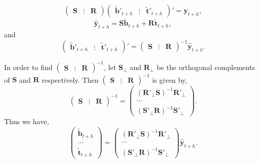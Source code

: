 \documentclass[a4paper, 11pt]{article}
\begin{document}
	\[
	\begin{pmatrix}
	\bm{S} & \vdots& \bm{R}
	\end{pmatrix}
	\begin{pmatrix}
	\tilde{\bm{b}}'_{t+h} & \vdots& \tilde{\bm{t}}'_{t+h}
	\end{pmatrix}'
	= \hat{\bm{y}}_{t+h},
	\]
	\[
	\hat{\bm{y}}_{t+h} = \bm{S}\tilde{\bm{b}}_{t+h} +  \bm{R}\tilde{\bm{t}}_{t+h},
	\]
	and
	\begin{equation}\label{4.3}
	\begin{pmatrix}
	\tilde{\bm{b}}'_{t+h} & \vdots& \tilde{\bm{t}}'_{t+h}
	\end{pmatrix}' =
	\begin{pmatrix}
	\bm{S} & \vdots& \bm{R}
	\end{pmatrix}^{-1}
	\hat{\bm{y}}_{t+h}.
	\end{equation}
	
	In order to find $\begin{pmatrix}\bm{S} & \vdots& \bm{R}\end{pmatrix}^{-1}$, let $\bm{S}_{\bot}$ and $\bm{R}_{\bot}$ be the orthogonal complements of $\bm{S}$ and $\bm{R}$
	respectively. Then $\begin{pmatrix}\bm{S} & \vdots& \bm{R}\end{pmatrix}^{-1}$ is given by,
	\begin{equation}
	\begin{pmatrix}\bm{S} & \vdots& \bm{R}\end{pmatrix}^{-1} = \begin{pmatrix}
	(\bm{R}'_\bot \bm{S})^{-1}\bm{R}'_\bot \\ \cdots \\ (\bm{S}'_\bot \bm{R})^{-1}\bm{S}'_\bot
	\end{pmatrix}.
	\end{equation}
	Thus we have,
	\begin{equation} \label{4.4}
	\begin{pmatrix}
	\tilde{\bm{b}}_{t+h} \\ \cdots \\ \tilde{\bm{t}}_{t+h}
	\end{pmatrix} = \begin{pmatrix}
	(\bm{R}'_\bot \bm{S})^{-1}\bm{R}'_\bot \\ \cdots \\ (\bm{S}'_\bot \bm{R})^{-1}\bm{S}'_\bot
	\end{pmatrix}\hat{\bm{y}}_{t+h}.
	\end{equation}
	
\end{document}
